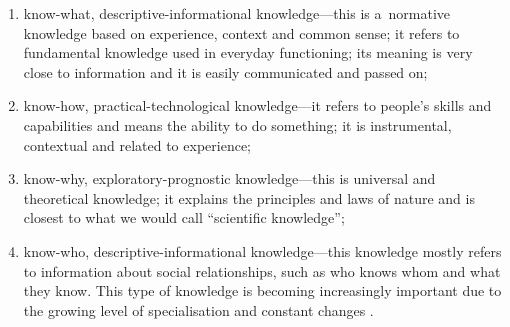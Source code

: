 \begin{enumerate}

\item know-what, descriptive-informational knowledge---this is a~normative knowledge based on experience, context and common sense; it refers to fundamental knowledge used in everyday functioning; its meaning is very close to information and it is easily communicated and passed on;

\item know-how, practical-technological knowledge---it refers to people's skills and capabilities and means the ability to do something; it is instrumental, contextual and related to experience;

\item know-why, exploratory-prognostic knowledge---this is universal and theoretical knowledge; it explains the principles and laws of nature and is closest to what we would call ``scientific knowledge'';

\item know-who, descriptive-informational knowledge---this knowledge mostly refers to information about social relationships, such as who knows whom and what they know. This type of knowledge is becoming increasingly important due to the growing level of specialisation and constant changes 
\parencites[][p.12]{oecd_knowledge-based_1996}[][p.190]{clarke_knowledge_2001}.%


\end{enumerate}

